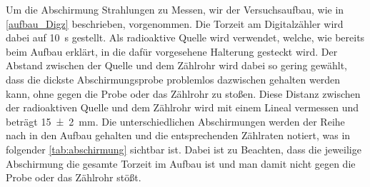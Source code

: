 \documentclass[12pt,english,ngerman]{scrartcl}
\begin{document}
Um die Abschirmung Strahlungen zu Messen, wir der Versuchsaufbau, wie in
\autoref{aufbau_Digz} beschrieben, vorgenommen. Die Torzeit am Digitalzähler
wird dabei auf \SI{10}{\second} gestellt. Als radioaktive Quelle wird
 verwendet, welche, wie bereits beim Aufbau erklärt, in die
dafür vorgesehene Halterung gesteckt wird. Der Abstand zwischen der Quelle und
dem Zählrohr wird dabei so gering gewählt, dass die dickste Abschirmungsprobe
problemlos dazwischen gehalten werden kann, ohne gegen die Probe oder das
Zählrohr zu stoßen. Diese Distanz zwischen der radioaktiven Quelle und dem
Zählrohr wird mit einem Lineal vermessen und beträgt \SI{15(2)}{\mm}. Die
unterschiedlichen Abschirmungen werden der Reihe nach in den Aufbau gehalten
und die entsprechenden Zählraten notiert, was in folgender
\autoref{tab:abschirmung} sichtbar ist. Dabei ist zu Beachten, dass die
jeweilige Abschirmung die gesamte Torzeit im Aufbau ist und man damit nicht
gegen die Probe oder das Zählrohr stößt.

\begin{table}[H]
  \caption[Erhaltene Zählraten bei verschiedenen Abschirmungsmaterialien]{Erhaltene Zählraten bei 
  verschiedenen Abschirmungsmaterialien bei einer Torzeit von \SI{10}{\second} und einem 
  Abstand der radioaktiven Quelle von \SI{15(2)}{\mm}. Die Unsicherheit beträgt dabei für alle Zählraten \SI{}{} \\ 
  $ z_{Luft} \dots$ erhaltene Zählrate ohne Abschirmung \\
  $ z_{\mathrm{Papier}} \dots$ erhaltene Zählrate mit einem Blatt Papier als Abschirmung \\
  $ z_{\mathrm{Lineal}} \dots$ erhaltene Zählrate mit einem Lineal als Abschirmung (Dicke = \SI{2.1(0.05)}{\mm})\\
  $ z_{\mathrm{Kunststoff}} \dots$ erhaltene Zählrate mit einer CD und zugehörigen Soulcase als Abschirmung \\
  $ z_{\mathrm{Alu \num{0.4}}} \dots$ erhaltene Zählrate mit mit einem Aluminiumblech als Abschirmung, Dicke = \SI{0.4(0.05)}{\mm}\\
  $ z_{\mathrm{Alu \num{0.8}}} \dots$ erhaltene Zählrate mit mit einem Aluminiumblech als Abschirmung, Dicke = \SI{0.8(0.05)}{\mm}\\
  $ z_{\mathrm{Alu \num{4}}} \dots$ erhaltene Zählrate mit mit einem Aluminiumblech als Abschirmung, Dicke = \SI{4(0.05)}{\mm}\\}
  \label{tab:abschirmung}
  \begin{center}
    
  \end{center}
\end{table}
\end{document}
